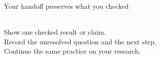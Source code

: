 \begin{frame}{Your handoff preserves what you checked}
  \vfill
  \begin{center}
    \\[1.3em]
    {\small Show one checked result or claim.}\\[0.7em]
    {\small Record the unresolved question and the next step.}\\[0.7em]
    {\small Continue the same practice on your research.}
  \end{center}
  \vfill
\end{frame}
